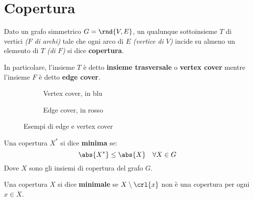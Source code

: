 \documentclass[\main/main.tex]{subfiles}
\begin{document}
\section{Copertura}
\begin{definition}[Copertura]
	Dato un grafo simmetrico \(G = \rnd{V, E}\), un qualunque sottoinsieme \(T\) di vertici \textit{(\(F\) di archi)} tale che ogni arco di \(E\) \textit{(vertice di \(V\))} incide su almeno un elemento di \(T\) \textit{(di \(F\))} si dice \textbf{copertura}.

	In particolare, l'insieme \(T\) è detto \textbf{insieme trasversale} o \textbf{vertex cover} mentre l'insieme \(F\) è detto \textbf{edge cover}.
	\begin{figure}
		\begin{subfigure}{0.49\textwidth}
			\VertexCover{}
			\caption{Vertex cover, in blu}
		\end{subfigure}
		\begin{subfigure}{0.49\textwidth}
			\EdgeCover{}
			\caption{Edge cover, in rosso}
		\end{subfigure}
		\caption{Esempi di edge e vertex cover}
	\end{figure}
\end{definition}
\begin{definition}
	Una copertura \(X^*\) si dice \textbf{minima} se:
	\[\abs{X^*} \leq \abs{X} \quad \forall X \in G\]
	Dove \(X\) sono gli insiemi di copertura del grafo \(G\).
\end{definition}
\begin{definition}
	Una copertura \(X\) si dice \textbf{minimale} se \(X \setminus \crl{x}\) non è una copertura per ogni \(x \in X\).
\end{definition}
\clearpage
\end{document}
